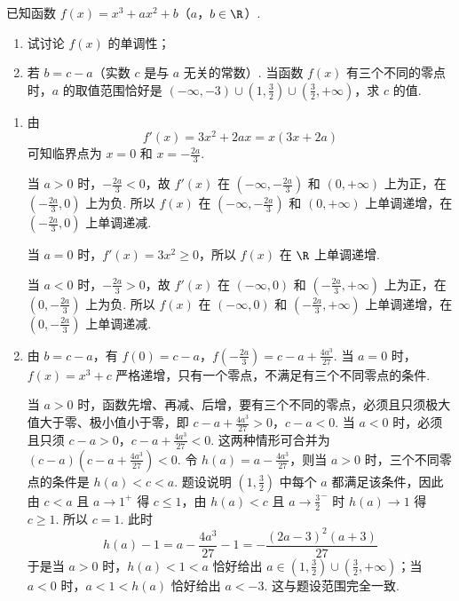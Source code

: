 \begin{problem}
已知函数 \(f(x) = x^3 + ax^2 + b\)（\(a\)，\(b \in \R\)）.
\begin{enumerate}
\item 试讨论 \(f(x)\) 的单调性；
\item 若 \(b = c - a\)（实数 \(c\) 是与 \(a\) 无关的常数）. 当函数 \(f(x)\) 有三个不同的零点时，\(a\) 的取值范围恰好是 \((-\infty, -3) \cup \left(1, \frac{3}{2}\right) \cup \left(\frac{3}{2}, +\infty\right)\)，求 \(c\) 的值.
\end{enumerate}
\end{problem}

\begin{solution}
\begin{enumerate}
\item 由
\[
f'(x)=3x^{2}+2ax=x(3x+2a)
\]
可知临界点为 \(x=0\) 和 \(x=-\frac{2a}{3}\).

当 \(a>0\) 时，\(-\frac{2a}{3}<0\)，故 \(f'(x)\) 在 \(\left(-\infty,-\frac{2a}{3}\right)\) 和 \((0,+\infty)\) 上为正，在 \(\left(-\frac{2a}{3},0\right)\) 上为负. 所以 \(f(x)\) 在 \(\left(-\infty,-\frac{2a}{3}\right)\) 和 \((0,+\infty)\) 上单调递增，在 \(\left(-\frac{2a}{3},0\right)\) 上单调递减.

当 \(a=0\) 时，\(f'(x)=3x^{2}\geqslant0\)，所以 \(f(x)\) 在 \(\R\) 上单调递增.

当 \(a<0\) 时，\(-\frac{2a}{3}>0\)，故 \(f'(x)\) 在 \((-\infty,0)\) 和 \(\left(-\frac{2a}{3},+\infty\right)\) 上为正，在 \(\left(0,-\frac{2a}{3}\right)\) 上为负. 所以 \(f(x)\) 在 \((-\infty,0)\) 和 \(\left(-\frac{2a}{3},+\infty\right)\) 上单调递增，在 \(\left(0,-\frac{2a}{3}\right)\) 上单调递减.

\item 由 \(b=c-a\)，有 \(f(0)=c-a\)，\(f\left(-\frac{2a}{3}\right)=c-a+\frac{4a^{3}}{27}\).
当 \(a=0\) 时，\(f(x)=x^3+c\) 严格递增，只有一个零点，不满足有三个不同零点的条件.

当 \(a>0\) 时，函数先增、再减、后增，要有三个不同的零点，必须且只须极大值大于零、极小值小于零，即 \(c-a+\frac{4a^{3}}{27}>0\)，\(c-a<0\).
当 \(a<0\) 时，必须且只须 \(c-a>0\)，\(c-a+\frac{4a^{3}}{27}<0\). 这两种情形可合并为 \(\left(c-a\right)\left(c-a+\frac{4a^{3}}{27}\right)<0\).
令 \(h(a)=a-\frac{4a^{3}}{27}\)，则当 \(a>0\) 时，三个不同零点的条件是 \(h(a)<c<a\). 题设说明 \((1,\frac32)\) 中每个 \(a\) 都满足该条件，因此由 \(c<a\) 且 \(a\to1^+\) 得 \(c\leqslant1\)，由 \(h(a)<c\) 且 \(a\to\frac32^-\) 时 \(h(a)\to1\) 得 \(c\geqslant1\). 所以 \(c=1\). 此时
\[
h(a)-1=a-\frac{4a^{3}}{27}-1=-\frac{(2a-3)^{2}(a+3)}{27}
\]
于是当 \(a>0\) 时，\(h(a)<1<a\) 恰好给出 \(a\in\left(1,\frac32\right)\cup\left(\frac32,+\infty\right)\)；当 \(a<0\) 时，\(a<1<h(a)\) 恰好给出 \(a<-3\). 这与题设范围完全一致.
\end{enumerate}
\end{solution}

